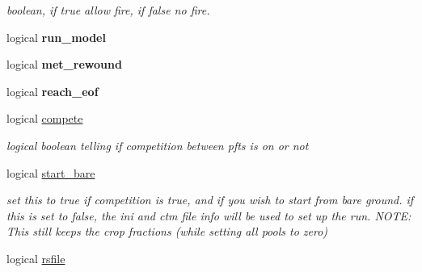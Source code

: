\begin{DoxyCompactItemize}
\begin{DoxyCompactList}\small\item\em boolean, if true allow fire, if false no fire. \end{DoxyCompactList}\item 
\hypertarget{structctem__statevars_1_1ctem__switches_ae2e9ab8c5be96ff3181086fdd7c9947a}{}logical {\bfseries run\+\_\+model}\label{structctem__statevars_1_1ctem__switches_ae2e9ab8c5be96ff3181086fdd7c9947a}

\item 
\hypertarget{structctem__statevars_1_1ctem__switches_ad7a7b7a618e9a3b1c99eba0997819593}{}logical {\bfseries met\+\_\+rewound}\label{structctem__statevars_1_1ctem__switches_ad7a7b7a618e9a3b1c99eba0997819593}

\item 
\hypertarget{structctem__statevars_1_1ctem__switches_a684002cb8929509826f7e4d9b9fd84a7}{}logical {\bfseries reach\+\_\+eof}\label{structctem__statevars_1_1ctem__switches_a684002cb8929509826f7e4d9b9fd84a7}

\item 
\hypertarget{structctem__statevars_1_1ctem__switches_abb88920ca0756c2d4adfd039cb935d77}{}logical \hyperlink{structctem__statevars_1_1ctem__switches_abb88920ca0756c2d4adfd039cb935d77}{compete}\label{structctem__statevars_1_1ctem__switches_abb88920ca0756c2d4adfd039cb935d77}

\begin{DoxyCompactList}\small\item\em logical boolean telling if competition between pfts is on or not \end{DoxyCompactList}\item 
\hypertarget{structctem__statevars_1_1ctem__switches_a03e1c96d2bd2c171fa6573ebe3bab7ef}{}logical \hyperlink{structctem__statevars_1_1ctem__switches_a03e1c96d2bd2c171fa6573ebe3bab7ef}{start\+\_\+bare}\label{structctem__statevars_1_1ctem__switches_a03e1c96d2bd2c171fa6573ebe3bab7ef}

\begin{DoxyCompactList}\small\item\em set this to true if competition is true, and if you wish to start from bare ground. if this is set to false, the ini and ctm file info will be used to set up the run. N\+O\+T\+E\+: This still keeps the crop fractions (while setting all pools to zero) \end{DoxyCompactList}\item 
\hypertarget{structctem__statevars_1_1ctem__switches_a083ca381c18987a286a76822d39c0a06}{}logical \hyperlink{structctem__statevars_1_1ctem__switches_a083ca381c18987a286a76822d39c0a06}{rsfile}\label{structctem__statevars_1_1ctem__switches_a083ca381c18987a286a76822d39c0a06}


\end{DoxyCompactItemize}

